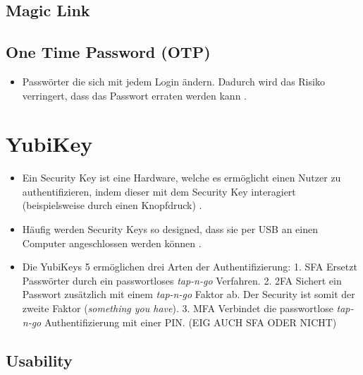 \subsection{Magic Link}

\subsection{One Time Password (OTP)}
\begin{itemize}
    \item Passwörter die sich mit jedem Login ändern. Dadurch wird das Risiko verringert, dass das Passwort erraten werden kann \cite{boonkrong2012security}.
\end{itemize}

\section{YubiKey}
 \begin{itemize}
    \item Ein Security Key ist eine Hardware, welche es ermöglicht einen Nutzer zu authentifizieren, indem dieser mit dem Security Key interagiert (beispielsweise durch einen Knopfdruck) \cite{reynolds2018tale}.
    \item Häufig werden Security Keys so designed, dass sie per USB an einen Computer angeschlossen werden können \cite{reynolds2018tale}.
    \item Die YubiKeys 5 ermöglichen drei Arten der Authentifizierung:
    1. \ac{SFA} Ersetzt Passwörter durch ein passwortloses \textit{tap-n-go} Verfahren.
    2. \ac{2FA} Sichert ein Passwort zusätzlich mit einem \textit{tap-n-go} Faktor ab. Der Security ist somit der zweite Faktor (\textit{something you have}).
    3. \ac{MFA} Verbindet die passwortlose \textit{tap-n-go} Authentifizierung mit einer PIN. (EIG AUCH SFA ODER NICHT)
 \end{itemize}

\subsection{Usability}

